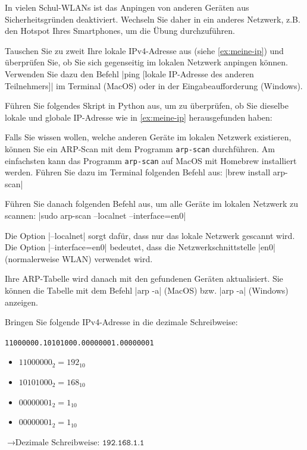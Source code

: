 \begin{mychallenge}
	In vielen Schul-\glspl{WLAN} ist das Anpingen von anderen Geräten aus Sicherheitsgründen deaktiviert. Wechseln Sie daher in ein anderes Netzwerk, z.B. den Hotspot Ihres Smartphones, um die Übung durchzuführen.

	Tauschen Sie zu zweit Ihre lokale \gls{IP}v4-Adresse aus (siehe \cref{ex:meine-ip}) und überprüfen Sie, ob Sie sich gegenseitig im lokalen Netzwerk anpingen können. Verwenden Sie dazu den Befehl \commandbox*|ping [lokale IP-Adresse des anderen Teilnehmers]| im Terminal (MacOS) oder in der Eingabeaufforderung (Windows).
\end{mychallenge}



\begin{mychallenge}
	Führen Sie folgendes Skript in Python aus, um zu überprüfen, ob Sie dieselbe lokale und globale \gls{IP}-Adresse wie in \cref{ex:meine-ip} herausgefunden haben:
	
\end{mychallenge}

\begin{mychallenge}
	Falls Sie wissen wollen, welche anderen Geräte im lokalen Netzwerk existieren, können Sie ein \gls{ARP}-Scan mit dem Programm \texttt{arp-scan} durchführen. Am einfachsten kann das Programm \texttt{arp-scan} auf MacOS mit Homebrew installiert werden. Führen Sie dazu im Terminal folgenden Befehl aus:
	\commandbox*|brew install arp-scan|

	Führen Sie danach folgenden Befehl aus, um alle Geräte im lokalen Netzwerk zu scannen:
	\commandbox*|sudo arp-scan --localnet --interface=en0|

	Die Option \commandbox*|--localnet| sorgt dafür, dass nur das lokale Netzwerk gescannt wird. Die Option \commandbox*|--interface=en0| bedeutet, dass die Netzwerkschnittstelle \commandbox|en0| (normalerweise WLAN) verwendet wird.

	Ihre \gls{ARP}-Tabelle wird danach mit den gefundenen Geräten aktualisiert. Sie können die Tabelle mit dem Befehl \commandbox*|arp -a| (MacOS) bzw. \commandbox*|arp -a| (Windows) anzeigen.
\end{mychallenge}

\begin{myexercise}
	Bringen Sie folgende \gls{IP}v4-Adresse in die dezimale Schreibweise:

	\texttt{11000000.10101000.00000001.00000001}

	\begin{myanswer}
		\begin{itemize}
			\item $11000000_2 = 192_{10}$
			\item $10101000_2 = 168_{10}$
			\item $00000001_2 = 1_{10}$
			\item $00000001_2 = 1_{10}$
		\end{itemize}
		$\rightarrow \text{Dezimale Schreibweise: }\texttt{192.168.1.1}$
	\end{myanswer}
\end{myexercise}

